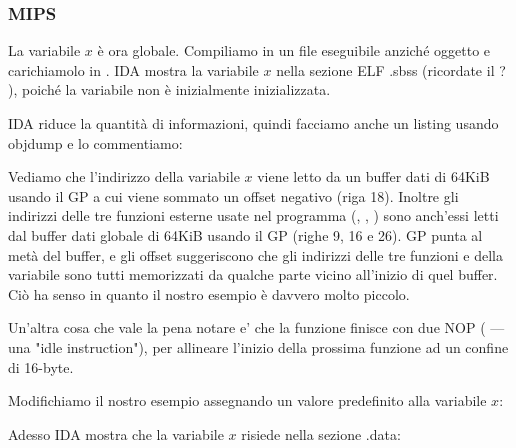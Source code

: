\subsubsection{MIPS}


La variabile $x$ è ora globale.
Compiliamo in un file eseguibile anziché oggetto e carichiamolo in \IDA.
IDA mostra la variabile $x$ nella sezione ELF .sbss (ricordate il ? ),
poiché la variabile non è inizialmente inizializzata.



IDA riduce la quantità di informazioni, quindi facciamo anche un listing usando objdump e lo commentiamo:



Vediamo che l'indirizzo della variabile $x$ viene letto da un buffer dati di 64KiB usando il GP a cui viene sommato un offset negativo (riga 18).
Inoltre gli indirizzi delle tre funzioni esterne usate nel programma (\puts, \scanf, \printf) sono anch'essi letti dal buffer dati globale di 64KiB usando il GP (righe 9, 16 e 26).
GP punta al metà del buffer, e gli offset suggeriscono che gli indirizzi delle tre funzioni e della variabile sono tutti memorizzati da qualche parte vicino all'inizio di quel buffer.
Ciò ha senso in quanto il nostro esempio è davvero molto piccolo.


Un'altra cosa che vale la pena notare e' che la funzione finisce con due \ac{NOP} ( --- una "idle instruction"), per allineare l'inizio della prossima funzione ad un confine di 16-byte.


Modifichiamo il nostro esempio assegnando un valore predefinito alla variabile $x$:



Adesso IDA mostra che la variabile $x$ risiede nella sezione .data:



